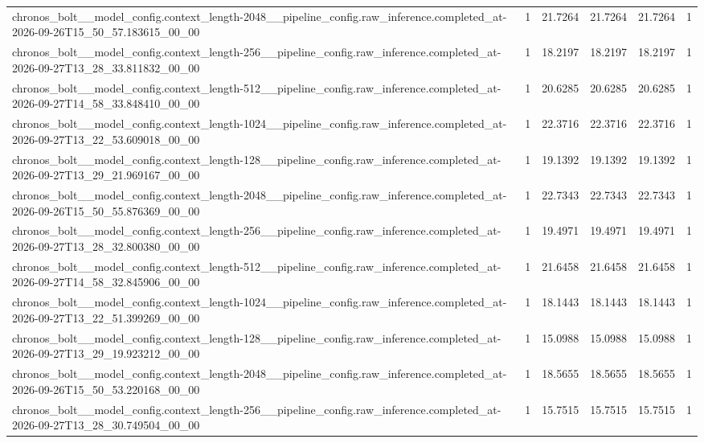 \begin{tabular}{llllll}
chronos\_bolt\_\_model\_config.context\_length-2048\_\_pipeline\_config.raw\_inference.completed\_at-2026-09-26T15\_50\_57.183615\_00\_00 & 1 & 21.7264 & 21.7264 & 21.7264 & 1 \\
chronos\_bolt\_\_model\_config.context\_length-256\_\_pipeline\_config.raw\_inference.completed\_at-2026-09-27T13\_28\_33.811832\_00\_00 & 1 & 18.2197 & 18.2197 & 18.2197 & 1 \\
chronos\_bolt\_\_model\_config.context\_length-512\_\_pipeline\_config.raw\_inference.completed\_at-2026-09-27T14\_58\_33.848410\_00\_00 & 1 & 20.6285 & 20.6285 & 20.6285 & 1 \\
chronos\_bolt\_\_model\_config.context\_length-1024\_\_pipeline\_config.raw\_inference.completed\_at-2026-09-27T13\_22\_53.609018\_00\_00 & 1 & 22.3716 & 22.3716 & 22.3716 & 1 \\
chronos\_bolt\_\_model\_config.context\_length-128\_\_pipeline\_config.raw\_inference.completed\_at-2026-09-27T13\_29\_21.969167\_00\_00 & 1 & 19.1392 & 19.1392 & 19.1392 & 1 \\
chronos\_bolt\_\_model\_config.context\_length-2048\_\_pipeline\_config.raw\_inference.completed\_at-2026-09-26T15\_50\_55.876369\_00\_00 & 1 & 22.7343 & 22.7343 & 22.7343 & 1 \\
chronos\_bolt\_\_model\_config.context\_length-256\_\_pipeline\_config.raw\_inference.completed\_at-2026-09-27T13\_28\_32.800380\_00\_00 & 1 & 19.4971 & 19.4971 & 19.4971 & 1 \\
chronos\_bolt\_\_model\_config.context\_length-512\_\_pipeline\_config.raw\_inference.completed\_at-2026-09-27T14\_58\_32.845906\_00\_00 & 1 & 21.6458 & 21.6458 & 21.6458 & 1 \\
chronos\_bolt\_\_model\_config.context\_length-1024\_\_pipeline\_config.raw\_inference.completed\_at-2026-09-27T13\_22\_51.399269\_00\_00 & 1 & 18.1443 & 18.1443 & 18.1443 & 1 \\
chronos\_bolt\_\_model\_config.context\_length-128\_\_pipeline\_config.raw\_inference.completed\_at-2026-09-27T13\_29\_19.923212\_00\_00 & 1 & 15.0988 & 15.0988 & 15.0988 & 1 \\
chronos\_bolt\_\_model\_config.context\_length-2048\_\_pipeline\_config.raw\_inference.completed\_at-2026-09-26T15\_50\_53.220168\_00\_00 & 1 & 18.5655 & 18.5655 & 18.5655 & 1 \\
chronos\_bolt\_\_model\_config.context\_length-256\_\_pipeline\_config.raw\_inference.completed\_at-2026-09-27T13\_28\_30.749504\_00\_00 & 1 & 15.7515 & 15.7515 & 15.7515 & 1 \\

\end{tabular}
